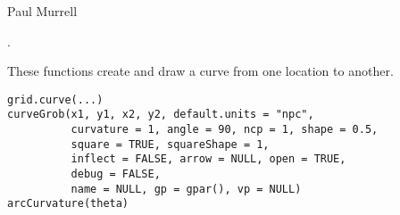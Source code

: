 %
\begin{Author}\relax
Paul Murrell
\end{Author}
%
\begin{SeeAlso}\relax
{}.
\end{SeeAlso}
%
\begin{Description}\relax
These functions create and draw a curve from one location
to another.
\end{Description}
%
\begin{Usage}
\begin{verbatim}
grid.curve(...)
curveGrob(x1, y1, x2, y2, default.units = "npc",
          curvature = 1, angle = 90, ncp = 1, shape = 0.5,
          square = TRUE, squareShape = 1, 
          inflect = FALSE, arrow = NULL, open = TRUE,
          debug = FALSE,
          name = NULL, gp = gpar(), vp = NULL)
arcCurvature(theta)
\end{verbatim}
\end{Usage}
%
